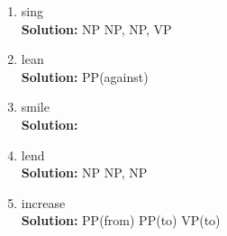 \documentclass[11pt]{article}
\begin{document}
\begin{enumerate}
\begin{enumerate}
\item sing \\
\textbf{Solution:} NP NP, NP, VP\\

\item lean \\
\textbf{Solution:} PP(against)\\

\item smile \\
\textbf{Solution:} \\

\item lend \\
\textbf{Solution:} NP NP, NP\\

\item increase \\
\textbf{Solution:} PP(from) PP(to) VP(to) \\

\end{enumerate}

\end{enumerate}  %
\end{document}
